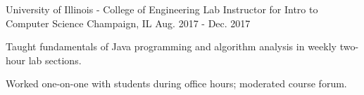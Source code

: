 \begin{cventries}
  \cventry
{University of Illinois - College of Engineering} %
{Lab Instructor for Intro to Computer Science} %
{Champaign, IL} %
{Aug. 2017 - Dec. 2017} %
{
	\begin{cvitems} %
		\item {Taught fundamentals of Java programming and algorithm analysis in weekly two-hour lab sections.}
		\item {Worked one-on-one with students during office hours; moderated course forum.}
	\end{cvitems}
}
\end{cventries}
